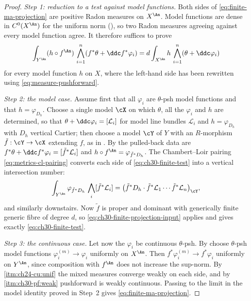 \begin{proof}
\emph{Step 1: reduction to a test against model functions.}  Both sides of
\eqref{eq:finite-ma-projection} are positive Radon measures on \(X^{\An}\).
Model functions are dense in \(C^0(X^{\An})\) for the uniform norm
(), so two Radon measures agreeing
against every model function agree.  It therefore suffices to prove
\begin{equation}
\label{eq:ch30-finite-test}
 \int_{Y^{\An}}(h\circ f^{\An})\,
  \bigwedge_{i=1}^n(f^*\theta+\ddc f^*\varphi_i)
 =d\int_{X^{\An}}h\,\bigwedge_{i=1}^n(\theta+\ddc\varphi_i)
\end{equation}
for every model function \(h\) on \(X\), where the left-hand side has been
rewritten using \eqref{eq:measure-pushforward}.

\emph{Step 2: the model case.}  Assume first that all \(\varphi_i\) are
\(\theta\)-psh model functions and that \(h=\varphi_{D_h}\).  Choose a
single model \(\cX\) on which \(\theta\), all the \(\varphi_i\) and \(h\)
are determined, so that
\(\theta+\ddc\varphi_i=[\mathcal L_i]\) for model line bundles
\(\mathcal L_i\) and \(h=\varphi_{D_h}\) with \(D_h\) vertical Cartier;
then choose a model \(\cY\) of \(Y\) with an \(R\)-morphism
\(\tilde f:\cY\to\cX\) extending \(f\), as in
.  By
 the pulled-back data are
\(f^*\theta+\ddc f^*\varphi_i=[\tilde f^*\mathcal L_i]\) and
\(h\circ f^{\An}=\varphi_{\tilde f^*D_h}\).  The Chambert--Loir pairing
\eqref{eq:metrics-cl-pairing} converts each side of
\eqref{eq:ch30-finite-test} into a vertical intersection number:
\[
 \int_{Y^{\An}}\varphi_{\tilde f^*D_h}\,
   \bigwedge_i[\tilde f^*\mathcal L_i]
 =\bigl(\tilde f^*D_h\cdot\tilde f^*\mathcal L_1\cdots
        \tilde f^*\mathcal L_n\bigr)_{\cY},
\]
and similarly downstairs.  Now \(\tilde f\) is proper and dominant with
generically finite generic fibre of degree \(d\), so
\eqref{eq:ch30-finite-projection-input} applies and gives exactly
\eqref{eq:ch30-finite-test}.

\emph{Step 3: the continuous case.}  Let now the \(\varphi_i\) be
continuous \(\theta\)-psh.  By  choose
\(\theta\)-psh model functions \(\varphi_i^{(m)}\to\varphi_i\) uniformly on
\(X^{\An}\).  Then \(f^*\varphi_i^{(m)}\to f^*\varphi_i\) uniformly on
\(Y^{\An}\), since composition with \(f^{\An}\) does not increase the
sup-norm.  By \,\cref{itm:ch24-cu:unif}
the mixed measures converge weakly on each side, and by
\,\cref{itm:ch30-pf:weak} pushforward is
weakly continuous.  Passing to the limit in the model identity proved in
Step~2 gives \eqref{eq:finite-ma-projection}.


\end{proof}
